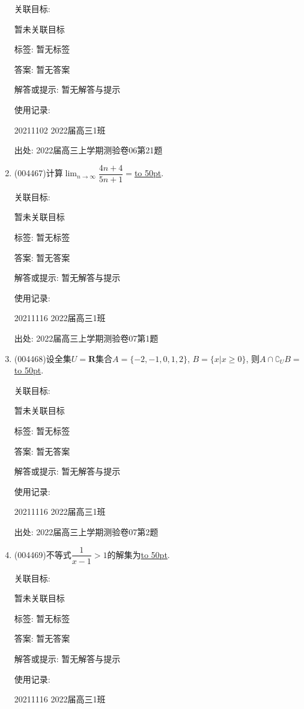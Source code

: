 \documentclass[10pt,a4paper]{article}
\newcommand{\blank}[1]{\underline{\hbox to #1pt{}}}
\begin{document}
\begin{enumerate}[1.]
关联目标:

暂未关联目标



标签: 暂无标签

答案: 暂无答案

解答或提示: 暂无解答与提示

使用记录:

20211102	2022届高三1班			


出处: 2022届高三上学期测验卷06第21题
\item { (004467)}计算$\displaystyle \lim_{n\to\infty}\dfrac{4n+4}{5n+1}=$\blank{50}.


关联目标:

暂未关联目标



标签: 暂无标签

答案: 暂无答案

解答或提示: 暂无解答与提示

使用记录:

20211116	2022届高三1班	


出处: 2022届高三上学期测验卷07第1题
\item { (004468)}设全集$U=\mathbf{R}$集合$A=\{-2,-1,0,1,2\}$, $B=\{x|x\ge 0\}$, 则$A\cap \complement_UB=$\blank{50}.


关联目标:

暂未关联目标



标签: 暂无标签

答案: 暂无答案

解答或提示: 暂无解答与提示

使用记录:

20211116	2022届高三1班	


出处: 2022届高三上学期测验卷07第2题
\item { (004469)}不等式$\dfrac 1{x-1}>1$的解集为\blank{50}.


关联目标:

暂未关联目标



标签: 暂无标签

答案: 暂无答案

解答或提示: 暂无解答与提示

使用记录:

20211116	2022届高三1班	



\end{enumerate}
\end{document}
